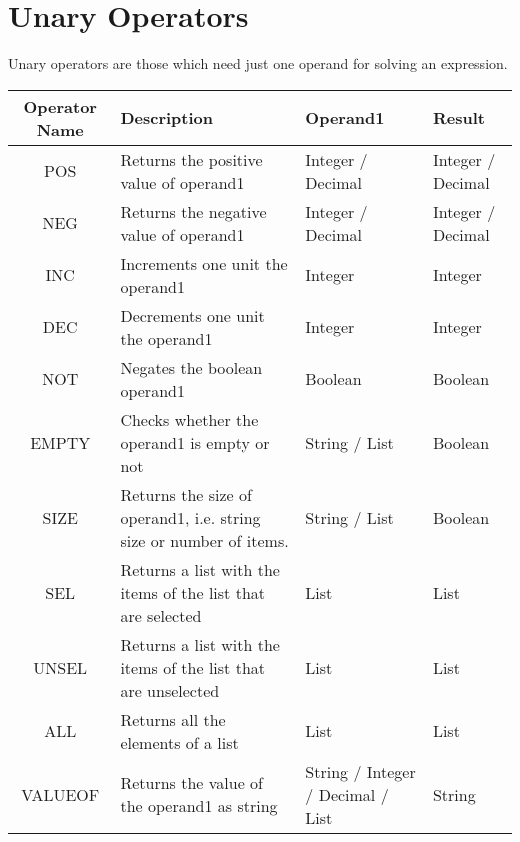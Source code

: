 \documentclass{article}
\begin{document}
\section{Unary Operators}
Unary operators are those which need just one operand for solving an expression.
\begin{center}
  \begin{tabular}{| c | p{3.5cm}| p{3cm} | p{3cm}| }
    \hline
    \textbf{Operator Name} & \textbf{Description} & \textbf{Operand1} & \textbf{Result} \\ \hline
     POS & Returns the positive value of operand1 & Integer / Decimal & Integer / Decimal \\ \hline
     NEG & Returns the negative value of operand1 & Integer / Decimal & Integer / Decimal \\ \hline
    INC & Increments one unit the operand1 & Integer & Integer \\ \hline
    DEC & Decrements one unit the operand1 & Integer & Integer \\ \hline
    NOT & Negates the boolean operand1 & Boolean & Boolean \\ \hline
    EMPTY & Checks whether the operand1 is empty or not & String / List & Boolean \\ \hline
    SIZE & Returns the size of operand1, i.e. string size or number of items.  & String / List & Boolean \\ \hline
    SEL  & Returns a list with the items of the list that are selected & List & List \\ \hline
    UNSEL & Returns a list with the items of the list that are unselected & List & List \\ \hline
    ALL & Returns all the elements of a list & List & List \\ \hline
    VALUEOF & Returns the value of the operand1 as string & String / Integer / Decimal / List & String \\ \hline
  \end{tabular}
\end{center}
\end{document}
